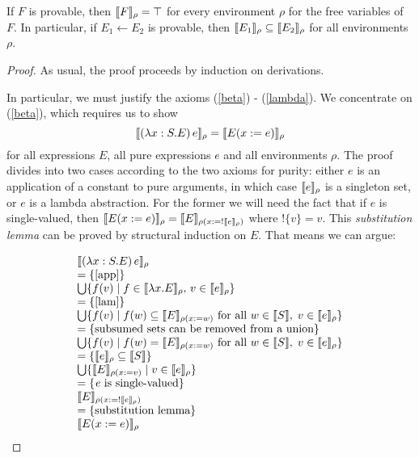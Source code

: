 \documentclass{llncs}
\newcommand{\Conid}[1]{\mathit{#1}}
\newcommand{\Varid}[1]{\mathit{#1}}
\begin{document}
\begin{theorem}[Soundness]
If $F$ is provable, then $\llbracket F\rrbracket_{\rho}=\top$ for every environment $\rho$ for the free variables of $F$.
In particular, if \ensuremath{\Conid{E}_{1}\leftarrow\Conid{E}_{2}} is provable, then $\llbracket E_1\rrbracket_{\rho}\subseteq\llbracket E_2\rrbracket_{\rho}$ for all environments $\rho$.
\end{theorem}
\begin{proof}
As usual, the proof proceeds by induction on derivations.

In particular, we must justify the axioms (\ref{beta}) - (\ref{lambda}).
We concentrate on (\ref{beta}), which
requires us to show
\[\llbracket(\lambda x:S.E)\, e\rrbracket_{\rho} = \llbracket E(x:=e)\rrbracket_{\rho}\]
for all expressions \ensuremath{\Conid{E}}, all pure expressions \ensuremath{\Varid{e}} and all environments \ensuremath{\rho }.  The proof divides into
two cases according to the two axioms for purity: either \ensuremath{\Varid{e}} is an application of a constant to pure arguments, in which case $\llbracket e\rrbracket_{\rho}$ is a singleton set, or $e$ is a lambda abstraction.
For the former we will need the fact that if \ensuremath{\Varid{e}} is single-valued, then
$\llbracket E(x:=e)\rrbracket_{\rho}  = \llbracket E\rrbracket_{\rho(x:= !\llbracket e\rrbracket_{\rho})}$
where $!\{v\}=v$. This \emph{substitution lemma} can be proved by structural induction on \ensuremath{\Conid{E}}.
That means we can argue:
\def\by#1{\\=\{\text{#1}\}\\}
\def\byref#1{\by{\ref{#1}}}

\[\begin{array}{l}
\semr{(\lambda x:S.E)\,e}
\byref{app}
         \bigcup \{ f(v) \mid f\in \semr{\lambda x.E},\, v \in\semr{e}\}
\byref{lam}
         \bigcup \{ f(v) \mid f(w) \sse \seme{E}{\rho(x:=w)} \text{ for all } w\in\sem{S},\; v\in \semr{e}\}
\by{subsumed sets can be removed from a union}
         \bigcup \{ f(v) \mid f(w) = \seme{E}{\rho(x:=w)} \text{ for all } w\in\sem{S},\; v\in \semr{e}\}
\by{$\semr{e}\sse\sem{S}$}
         \bigcup \{ \seme{E}{\rho(x:=v)} \mid  v \in \semr{e}\}
\by{\ensuremath{\Varid{e}} is single-valued}
         \seme{E}{\rho(x:= !\semr{e})}
\by{substitution lemma}
         \semr{E(x:=e)}
\end{array}\]


\end{proof}
\end{document}
